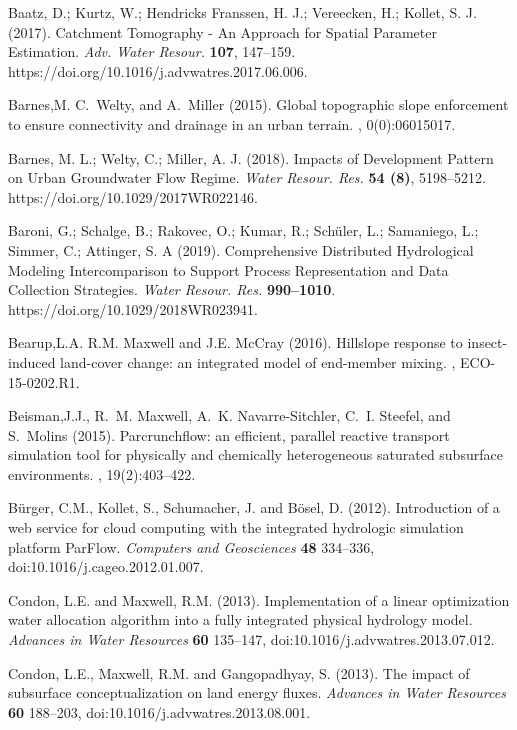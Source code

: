 \begin{thebibliography}{999}
Baatz, D.; Kurtz, W.; Hendricks Franssen, H. J.; Vereecken, H.; Kollet, S. J. (2017). Catchment Tomography - An Approach for Spatial Parameter Estimation. {\em Adv. Water Resour.} {\bf 107}, 147–159. https://doi.org/10.1016/j.advwatres.2017.06.006.

Barnes,M. C.~Welty, and A.~Miller (2015).
\newblock Global topographic slope enforcement to ensure connectivity and
  drainage in an urban terrain.
, 0(0):06015017.

Barnes, M. L.; Welty, C.; Miller, A. J. (2018). Impacts of Development Pattern on Urban Groundwater Flow Regime. {\em Water Resour. Res.} {\bf 54 (8)}, 5198–5212. https://doi.org/10.1029/2017WR022146.

Baroni, G.; Schalge, B.; Rakovec, O.; Kumar, R.; Schüler, L.; Samaniego, L.; Simmer, C.; Attinger, S. A (2019). Comprehensive Distributed Hydrological Modeling Intercomparison to Support Process Representation and Data Collection Strategies. {\em Water Resour. Res.} {\bf 990–1010}. https://doi.org/10.1029/2018WR023941.

Bearup,L.A. R.M. Maxwell and J.E. McCray (2016).
\newblock Hillslope response to insect-induced land-cover change: an integrated
  model of end-member mixing.
,
\newblock ECO-15-0202.R1.

Beisman,J.J., R.~M. Maxwell, A.~K. Navarre-Sitchler, C.~I. Steefel, and
S.~Molins (2015).
\newblock Parcrunchflow: an efficient, parallel reactive transport simulation
  tool for physically and chemically heterogeneous saturated subsurface
  environments.
, 19(2):403--422.


B{\"u}rger, C.M., Kollet, S., Schumacher, J. and Bösel, D. (2012). Introduction of a web service for cloud computing with the integrated hydrologic simulation platform ParFlow. {\em Computers and Geosciences} {\bf 48} 334--336, doi:10.1016/j.cageo.2012.01.007.

Condon, L.E. and Maxwell, R.M. (2013). Implementation of a linear optimization water allocation algorithm into a fully integrated physical hydrology model. {\em Advances in Water Resources} {\bf 60} 135--147, doi:10.1016/j.advwatres.2013.07.012.

Condon, L.E., Maxwell, R.M. and Gangopadhyay, S. (2013). The impact of subsurface conceptualization on land energy fluxes. {\em Advances in Water Resources} {\bf 60} 188--203, doi:10.1016/j.advwatres.2013.08.001.


\end{thebibliography}
